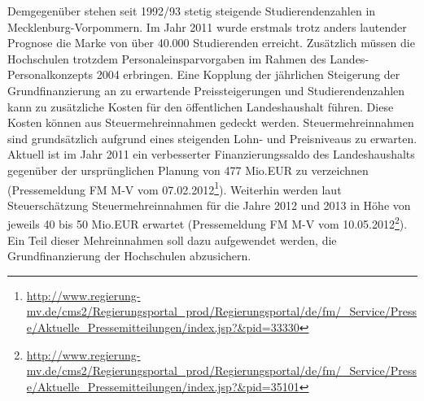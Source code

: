 Demgegenüber stehen seit 1992/93 stetig steigende Studierendenzahlen in Mecklenburg-Vorpommern. Im Jahr 2011 wurde erstmals trotz anders lautender Prognose die Marke von über 40.000 Studierenden erreicht. Zusätzlich müssen die Hochschulen trotzdem Personaleinsparvorgaben im Rahmen des Landes-Personalkonzepts 2004 erbringen. Eine Kopplung der jährlichen Steigerung der Grundfinanzierung an zu erwartende Preissteigerungen und Studierendenzahlen kann zu zusätzliche Kosten für den öffentlichen Landeshaushalt führen. Diese Kosten können aus Steuermehreinnahmen gedeckt werden. Steuermehreinnahmen sind grundsätzlich aufgrund eines steigenden Lohn- und Preisniveaus zu erwarten. Aktuell ist im Jahr 2011 ein verbesserter Finanzierungssaldo des Landeshaushalts gegenüber der ursprünglichen Planung von 477 Mio.EUR zu verzeichnen (Pressemeldung FM M-V vom 07.02.2012\footnote{\url{http://www.regierung-mv.de/cms2/Regierungsportal\_prod/Regierungsportal/de/fm/\_Service/Presse/Aktuelle\_Pressemitteilungen/index.jsp?\&pid=33330}}). Weiterhin werden laut Steuerschätzung Steuermehreinnahmen für die Jahre 2012 und 2013 in Höhe von jeweils 40 bis 50 Mio.EUR erwartet (Pressemeldung FM M-V vom 10.05.2012\footnote{\url{http://www.regierung-mv.de/cms2/Regierungsportal\_prod/Regierungsportal/de/fm/\_Service/Presse/Aktuelle\_Pressemitteilungen/index.jsp?\&pid=35101}}). Ein Teil dieser Mehreinnahmen soll dazu aufgewendet werden, die Grundfinanzierung der Hochschulen abzusichern.
